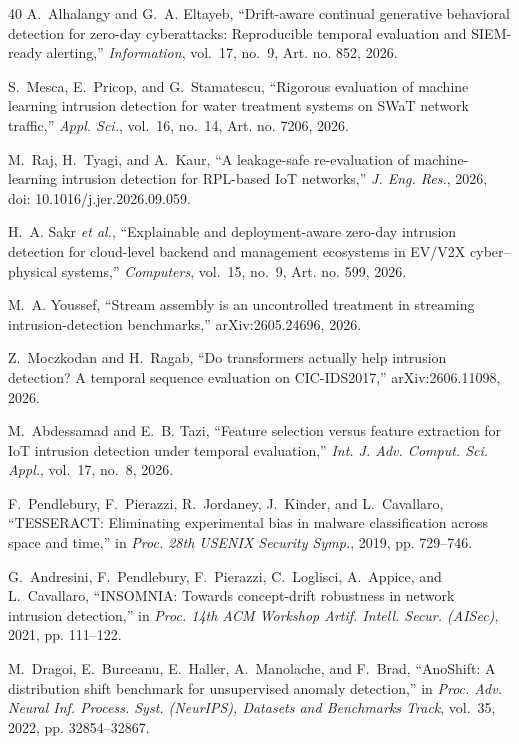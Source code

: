 \begin{thebibliography}{40}
A.~Alhalangy and G.~A. Eltayeb, ``Drift-aware continual generative behavioral detection for zero-day cyberattacks: Reproducible temporal evaluation and SIEM-ready alerting,'' \emph{Information}, vol.~17, no.~9, Art. no. 852, 2026.

S.~Mesca, E.~Pricop, and G.~Stamatescu, ``Rigorous evaluation of machine learning intrusion detection for water treatment systems on SWaT network traffic,'' \emph{Appl. Sci.}, vol.~16, no.~14, Art. no. 7206, 2026.

M.~Raj, H.~Tyagi, and A.~Kaur, ``A leakage-safe re-evaluation of machine-learning intrusion detection for RPL-based IoT networks,'' \emph{J. Eng. Res.}, 2026, doi: 10.1016/j.jer.2026.09.059.

H.~A. Sakr \emph{et al.}, ``Explainable and deployment-aware zero-day intrusion detection for cloud-level backend and management ecosystems in EV/V2X cyber--physical systems,'' \emph{Computers}, vol.~15, no.~9, Art. no. 599, 2026.

M.~A. Youssef, ``Stream assembly is an uncontrolled treatment in streaming intrusion-detection benchmarks,'' arXiv:2605.24696, 2026.

Z.~Moczkodan and H.~Ragab, ``Do transformers actually help intrusion detection? A temporal sequence evaluation on CIC-IDS2017,'' arXiv:2606.11098, 2026.

M.~Abdessamad and E.~B. Tazi, ``Feature selection versus feature extraction for IoT intrusion detection under temporal evaluation,'' \emph{Int. J. Adv. Comput. Sci. Appl.}, vol.~17, no.~8, 2026.

F.~Pendlebury, F.~Pierazzi, R.~Jordaney, J.~Kinder, and L.~Cavallaro, ``TESSERACT: Eliminating experimental bias in malware classification across space and time,'' in \emph{Proc. 28th USENIX Security Symp.}, 2019, pp. 729--746.

G.~Andresini, F.~Pendlebury, F.~Pierazzi, C.~Loglisci, A.~Appice, and L.~Cavallaro, ``INSOMNIA: Towards concept-drift robustness in network intrusion detection,'' in \emph{Proc. 14th ACM Workshop Artif. Intell. Secur. (AISec)}, 2021, pp. 111--122.

M.~Dragoi, E.~Burceanu, E.~Haller, A.~Manolache, and F.~Brad, ``AnoShift: A distribution shift benchmark for unsupervised anomaly detection,'' in \emph{Proc. Adv. Neural Inf. Process. Syst. (NeurIPS), Datasets and Benchmarks Track}, vol.~35, 2022, pp. 32854--32867.


\end{thebibliography}
